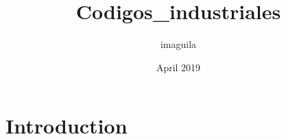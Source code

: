 \documentclass{article}
\title{Codigos_industriales}
\author{imaguila }
\date{April 2019}
\begin{document}
\maketitle

\section{Introduction}
\end{document}

